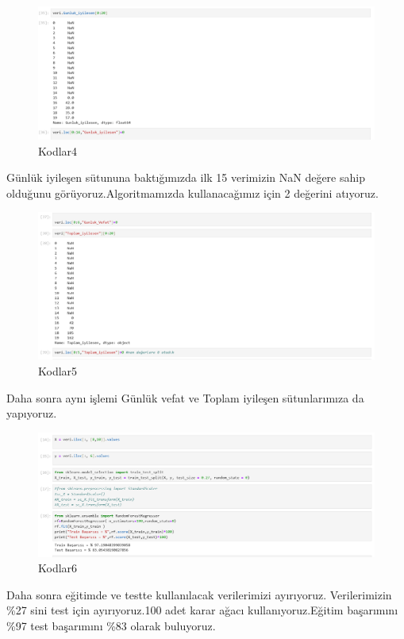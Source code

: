 \documentclass[12pt, a4paper]{article}
\begin{document}
	\begin{figure}[!htbp] 
		\caption{Kodlar4}
		\centering
		\includegraphics[angle=0, width=\textwidth]{8.0.png} 
		
	\end{figure}
	
	\newpage
	Günlük iyileşen sütununa baktığımızda ilk 15 verimizin NaN değere sahip olduğunu görüyoruz.Algoritmamızda kullanacağımız için 2 değerini atıyoruz.
	\begin{figure}[!htbp] 
		\caption{Kodlar5}
		\centering
		\includegraphics[angle=0, width=\textwidth]{9.0.png} 
		
	\end{figure}
	Daha sonra aynı işlemi Günlük vefat ve Toplam iyileşen sütunlarımıza da yapıyoruz.
	
	\begin{figure}[!htbp] 
		\caption{Kodlar6}
		\centering
		\includegraphics[angle=0, width=\textwidth]{10.0.png} 
		
	\end{figure}
	\newpage
	Daha sonra eğitimde ve testte kullanılacak verilerimizi ayırıyoruz. Verilerimizin \%27 sini test için ayırıyoruz.100 adet karar ağacı kullanıyoruz.Eğitim başarımını \%97 test başarımını \%83 olarak buluyoruz.
	
\end{document}
